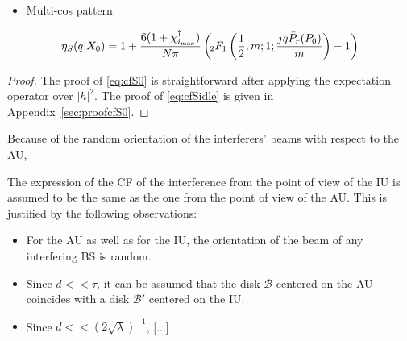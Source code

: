 \begin{proposition}
    \begin{itemize}
        \item {Multi-cos pattern}
    \end{itemize} 
{\small
\begin{equation}\label{eq:eta_S_mc}
        \eta_S(q|X_0) =  1+\frac{6(1+\chi_{i_{\textrm{\normalfont max}}}^\dagger)}{N\pi}  \left(\!{}_2F_1\left(\frac{1}{2}, m;1;\frac{j q \Bar{P}_r(P_0)}{m}\right) -1\right)
\end{equation}}
\end{proposition}
\begin{proof}
    The proof of \eqref{eq:cfS0} is straightforward after applying the expectation operator over $|h|^2$. The proof of \eqref{eq:cfSidle} is given in Appendix~\ref{sec:proofcfS0}.
\end{proof}

Because of the random orientation of the interferers' beams with respect to the AU, 

The expression of the CF of the interference from the point of view of the IU is assumed to be the same as the one from the point of view of the AU. This is justified by the following observations:
\begin{itemize}
    \item For the AU as well as for the IU, the orientation of the beam of any interfering BS is random.
    \item Since $d << \tau$, it can be assumed that the disk $\mathcal{B}$ centered on the AU coincides with a disk $\mathcal{B}'$ centered on the IU.
    \item Since $d << (2\sqrt{\lambda})^{-1}$, [...] 
\end{itemize}


